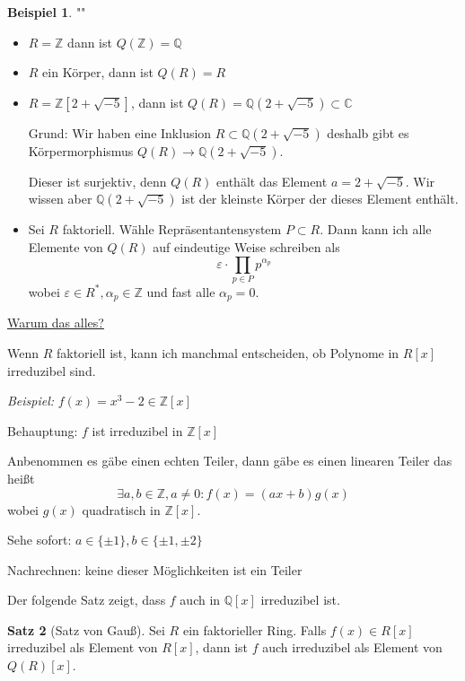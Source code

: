 \documentclass[12pt,parskip=full]{scrartcl}
\newcommand{\setZ}{\mathbb{Z}}
\newcommand{\setQ}{\mathbb{Q}}
\newcommand{\setC}{\mathbb{C}}
\newcommand{\heading}{\underline}
\theoremstyle{definition}
\newtheorem{theorem}{Satz}[section]
\newtheorem{example}[theorem]{Beispiel}
\theoremstyle{remark}
\begin{document}
	\begin{example}""
		\begin{itemize}
			\item $R = \setZ$ dann ist $Q(\setZ) = \setQ$
			\item $R$ ein Körper, dann ist $Q(R) = R$
			\item $R = \setZ[2 + \sqrt{-5}]$, dann ist $Q(R) = \setQ(2 + \sqrt{-5}) \subset \setC$
			
			Grund: Wir haben eine Inklusion $R \subset \setQ(2 + \sqrt{-5})$ deshalb gibt es Körpermorphismus $Q(R) \to \setQ(2 + \sqrt{-5})$.
			
			Dieser ist surjektiv, denn $Q(R)$ enthält das Element $a = 2 + \sqrt{-5}$. Wir wissen aber $\setQ(2 + \sqrt{-5})$ ist der kleinste Körper der dieses Element enthält.
			\item Sei $R$ faktoriell. Wähle Repräsentantensystem $P \subset R$. Dann kann ich alle Elemente von $Q(R)$ auf eindeutige Weise schreiben als
			\begin{equation*}
				\varepsilon \cdot \prod_{p \in P} p^{\alpha_p}
			\end{equation*}
			wobei $\varepsilon \in R^*, \alpha_p \in \setZ$ und fast alle $\alpha_p = 0$.
		\end{itemize}
	\end{example}

	\heading{Warum das alles?}
	
	Wenn $R$ faktoriell ist, kann ich manchmal entscheiden, ob Polynome in $R[x]$ irreduzibel sind.
	
	\textit{Beispiel:} $f(x) = x^3 - 2 \in \setZ[x]$
	
	Behauptung: $f$ ist irreduzibel in $\setZ[x]$
	
	Anbenommen es gäbe einen echten Teiler, dann gäbe es einen linearen Teiler das heißt
	\begin{equation*}
		\exists a,b \in \setZ, a \neq 0: f(x) = (ax + b) g(x)
	\end{equation*}
	wobei $g(x)$ quadratisch in $\setZ[x]$.
	
	Sehe sofort: $a \in \{ \pm 1 \}, b \in \{ \pm 1, \pm 2 \}$
	
	Nachrechnen: keine dieser Möglichkeiten ist ein Teiler
	
	Der folgende Satz zeigt, dass $f$ auch in $\setQ[x]$ irreduzibel ist.
	
	\begin{theorem}[Satz von Gauß]
		Sei $R$ ein faktorieller Ring. Falls $f(x) \in R[x]$ irreduzibel als Element von $R[x]$, dann ist $f$ auch irreduzibel als Element von $Q(R)[x]$.
	\end{theorem}
\end{document}
